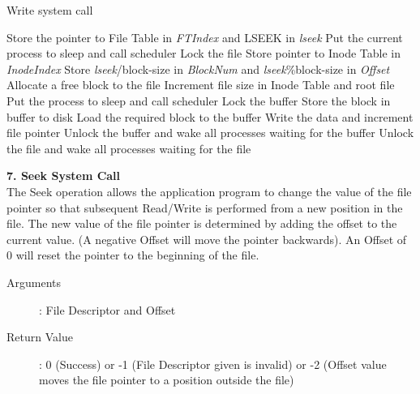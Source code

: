 \documentclass[11pt ,twosided]{article}
\begin{document}
\begin{algorithm}
\caption{Write system call}
\begin{algorithmic}
\ENDIF
{}
\ELSE 
    \STATE Store the pointer to File Table in \textit{FTIndex} and LSEEK in \textit{lseek}
\ENDIF
{}
            \STATE Put the current process to sleep and call scheduler
        \ENDWHILE
    \ENDIF
\ENDIF
\STATE Lock the file
\STATE Store pointer to Inode Table in \textit{InodeIndex}
\STATE Store \textit{lseek}/block-size in \textit{BlockNum} and \textit{lseek}\%block-size in \textit{Offset}
    \ELSE
        \STATE Allocate a free block to the file
        \STATE Increment file size in Inode Table and root file
    \ENDIF
\ENDIF
{}
            \STATE Put the process to sleep and call scheduler
        \ENDWHILE
    \ENDIF
\ENDIF
\STATE Lock the buffer
        \STATE Store the block in buffer to disk
    \ENDIF
    \STATE Load the required block to the buffer
\ENDIF
\STATE Write the data and increment file pointer
\STATE Unlock the buffer and wake all processes waiting for the buffer
\STATE Unlock the file and wake all processes waiting for the file
\end{algorithmic}
\end{algorithm}
\vspace{3mm}
\fi
\textbf{7. Seek System Call}
\vspace{3mm}\\
The Seek operation allows the application program to change the value of the file pointer so that subsequent Read/Write is performed from a new position in the file. The new value of the file pointer is determined by adding the offset to the current value. (A negative Offset will move the pointer backwards). An Offset of 0 will reset the pointer to the beginning of the file. 
\begin{description}
	\item[Arguments]: File Descriptor and Offset
	\item[Return Value]: 0 (Success) or -1 (File Descriptor given is invalid) or -2 (Offset value moves the file pointer to a position outside the file)
\end{description} 
\end{document}
